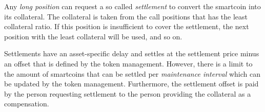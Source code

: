 \label{sec:settlement}

Any \emph{long position} can request a so called
\emph{settlement} to convert the smartcoin into its collateral. 
The collateral is taken from the call positions that has
the least collateral ratio. If this position is insufficient to cover
the settlement, the next position with the least collateral will be used, and so on.

Settlements have an asset-specific delay and settles at the settlement price minus an offset
that is defined by the token management. However, there is a limit to the amount of smartcoins that can be settled per
\emph{maintenance interval} which can be updated by the token management.
Furthermore, the settlement offset is paid by the person requesting settlement
to the person providing the collateral as a compensation.

